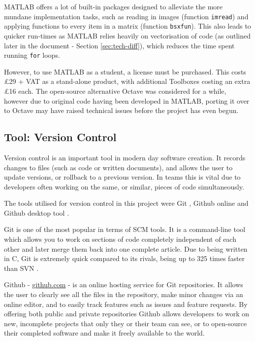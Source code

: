 MATLAB offers a lot of built-in packages designed to alleviate the more mundane implementation tasks, such as reading in images (function \texttt{imread}) and applying functions to every item in a matrix (function \texttt{bsxfun}). This also leads to quicker run-times as MATLAB relies heavily on vectorisation of code (as outlined later in the document - Section \ref{sec:tech-diff}), which reduces the time spent running \texttt{for} loops.

However, to use MATLAB as a student, a license must be purchased. This costs \pounds29 + VAT as a stand-alone product, with additional Toolboxes costing an extra \pounds16 each. The open-source alternative Octave \cite{octave} was considered for a while, however due to original code having been developed in MATLAB, porting it over to Octave may have raised technical issues before the project has even begun.

\subsection{Tool: Version Control}

Version control is an important tool in modern day software creation. It records changes to files (such as code or written documents), and allows the user to update versions, or rollback to a previous version. In teams this is vital due to developers often working on the same, or similar, pieces of code simultaneously.

The tools utilised for version control in this project were Git \cite{2014gits}, Github online \cite{github} and Github desktop tool \cite{github_desktop}.

Git \cite{2014gits} is one of the most popular in terms of \acrfull{SCM} tools. It is a command-line tool which allows you to work on sections of code completely independent of each other and later merge them back into one complete article. Due to being written in C, Git is extremely quick compared to its rivals, being up to 325 times faster than \acrfull{SVN} \cite{About_Git}.

Github \cite{github} - \url{github.com} - is an online hosting service for Git repositories. It allows the user to clearly see all the files in the repository, make minor changes via an online editor, and to easily track features such as issues and feature requests. By offering both public and private repositories Github allows developers to work on new, incomplete projects that only they or their team can see, or to open-source their completed software and make it freely available to the world.

